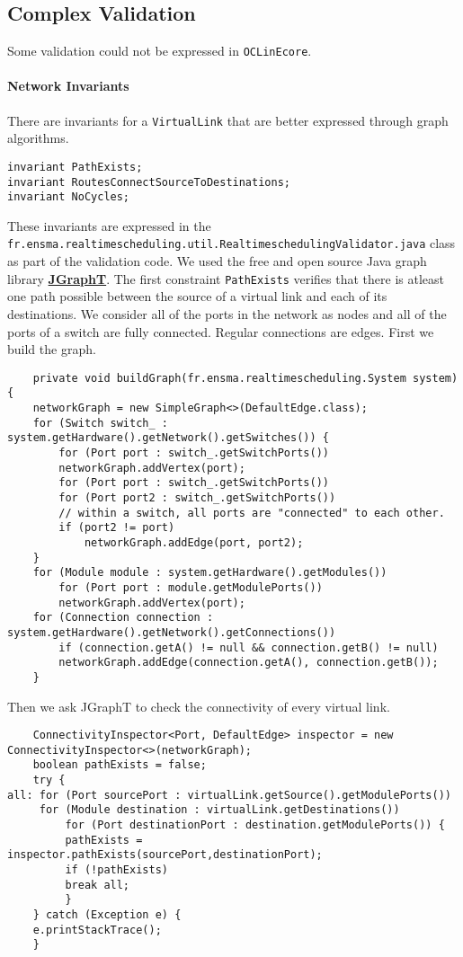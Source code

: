\subsection{Complex Validation} \label{complex_validation}
Some validation could not be expressed in \texttt{OCLinEcore}.
\paragraph{Network Invariants} There are invariants for a \texttt{VirtualLink}
that are better expressed through graph algorithms.
\begin{lstlisting}[caption=VirtualLink graph invariants]
invariant PathExists;
invariant RoutesConnectSourceToDestinations;
invariant NoCycles;
\end{lstlisting}
These invariants are expressed in the \texttt{fr.ensma.realtimescheduling.util.RealtimeschedulingValidator.java}
class as part of the validation code.
We used the free and open source Java graph library \href{http://jgrapht.org/}{\textbf{JGraphT}}.
The first constraint \texttt{PathExists} verifies that there is atleast one path possible
between the source of a virtual link and each of its destinations. We consider all
of the ports in the network as nodes and all of the ports of a switch are fully connected.
Regular connections are edges.
First we build the graph.
\begin{verbatim}
    private void buildGraph(fr.ensma.realtimescheduling.System system) {
    networkGraph = new SimpleGraph<>(DefaultEdge.class); 
    for (Switch switch_ : system.getHardware().getNetwork().getSwitches()) { 
        for (Port port : switch_.getSwitchPorts()) 
	    networkGraph.addVertex(port);
        for (Port port : switch_.getSwitchPorts()) 
	    for (Port port2 : switch_.getSwitchPorts()) 
		// within a switch, all ports are "connected" to each other.
		if (port2 != port) 
		    networkGraph.addEdge(port, port2);
	}
    for (Module module : system.getHardware().getModules()) 
        for (Port port : module.getModulePorts()) 
        networkGraph.addVertex(port);
    for (Connection connection : system.getHardware().getNetwork().getConnections()) 
        if (connection.getA() != null && connection.getB() != null) 
	    networkGraph.addEdge(connection.getA(), connection.getB());
    }
\end{verbatim}
Then we ask JGraphT to check the connectivity of every virtual link.
\begin{verbatim}
    ConnectivityInspector<Port, DefaultEdge> inspector = new ConnectivityInspector<>(networkGraph);
    boolean pathExists = false;
    try {
all: for (Port sourcePort : virtualLink.getSource().getModulePorts()) 
	 for (Module destination : virtualLink.getDestinations()) 
	     for (Port destinationPort : destination.getModulePorts()) {
	     pathExists = inspector.pathExists(sourcePort,destinationPort);
	     if (!pathExists)
		 break all;
	     }
    } catch (Exception e) {
    e.printStackTrace();
    }
\end{verbatim}
